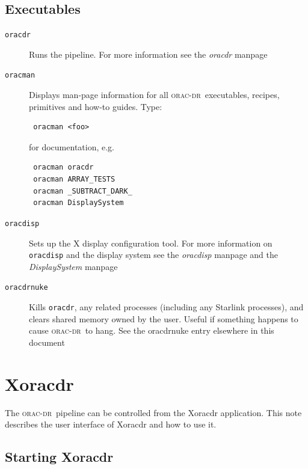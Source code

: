 \documentclass[twoside,11pt]{article}
\newcommand{\xlabel}[1]{}
\renewcommand{\_}{\texttt{\symbol{95}}}
\newcommand{\oracdr}{\textsc{orac-dr}}
\begin{document}
\subsection*{Executables\label{ORAC-DR_Components_Executables}}\begin{description}
\item[\texttt{oracdr}] \mbox{}

Runs the pipeline. For more information see the \emph{oracdr} manpage

\item[\texttt{oracman}] \mbox{}

Displays man-page information for all \oracdr\ executables, recipes,
primitives and how-to guides. Type:

\begin{verbatim}
 oracman <foo>
\end{verbatim}


for documentation, e.g.

\begin{verbatim}
 oracman oracdr
 oracman ARRAY_TESTS
 oracman _SUBTRACT_DARK_
 oracman DisplaySystem
\end{verbatim}
\item[\texttt{oracdisp}] \mbox{}

Sets up the X display configuration tool. For more information on
\texttt{oracdisp} and the display system see the \emph{oracdisp} manpage and the \emph{DisplaySystem} manpage

\item[\texttt{oracdr\_nuke}] \mbox{}

Kills \texttt{oracdr}, any related processes (including any Starlink
processes), and clears shared memory owned by the user. Useful if
something happens to cause \oracdr\ to hang. See the \textsf{oracdr\_nuke}
 entry elsewhere in this document

\end{description}

\section{Xoracdr\label{Xoracdr}\xlabel{xoracdr}}

The \oracdr\ pipeline can be controlled from the Xoracdr
application. This note describes the user interface of Xoracdr and how
to use it.

\subsection*{Starting Xoracdr\label{Xoracdr_STARTING_XORACDR}}
\end{document}
